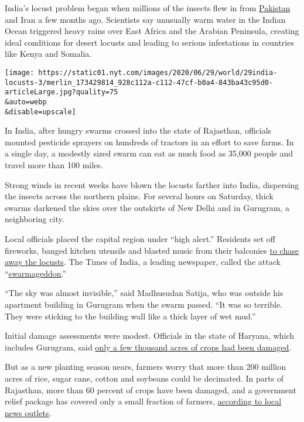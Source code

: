 India's locust problem began when millions of the insects flew in from
\href{https://www.nytimes.com/2020/06/29/world/asia/pakistan-stock-exchange-shooting.html}{Pakistan}
and Iran a few months ago. Scientists say unusually warm water in the
Indian Ocean triggered heavy rains over East Africa and the Arabian
Peninsula, creating ideal conditions for desert locusts and leading to
serious infestations in countries like Kenya and Somalia.

\texttt{[image: https://static01.nyt.com/images/2020/06/29/world/29india-locusts-3/merlin\_173429814\_928c112a-c112-47cf-b0a4-843ba43c95d0-articleLarge.jpg?quality=75\\\&auto=webp\\\&disable=upscale]}

In India, after hungry swarms crossed into the state of Rajasthan,
officials mounted pesticide sprayers on hundreds of tractors in an
effort to save farms. In a single day, a modestly sized swarm can eat as
much food as 35,000 people and travel more than 100 miles.

Strong winds in recent weeks have blown the locusts farther into India,
dispersing the insects across the northern plains. For several hours on
Saturday, thick swarms darkened the skies over the outskirts of New
Delhi and in Gurugram, a neighboring city.

Local officials placed the capital region under ``high alert.''
Residents set off fireworks, banged kitchen utensils and blasted music
from their balconies
\href{https://www.hindustantimes.com/delhi-news/after-locust-swarms-seen-in-delhi-neem-leaves-and-firecrackers-to-chase-pests/story-Rz9CzRaWscDWXbFWUC0EBM.html}{to
chase away the locusts}. The Times of India, a leading newspaper, called
the attack
``\href{https://timesofindia.indiatimes.com/india/swarmageddon-looks-like-this-locusts-fly-into-ncr/articleshow/76668130.cms}{swarmageddon}.''

``The sky was almost invisible,'' said Madhusudan Satija, who was
outside his apartment building in Gurugram when the swarm passed. ``It
was so terrible. They were sticking to the building wall like a thick
layer of wet mud.''

Initial damage assessments were modest. Officials in the state of
Haryana, which includes Gurugram, said
\href{https://www.tribuneindia.com/news/haryana/5-km-long-locust-swarm-haryana-on-alert-105220}{only
a few thousand acres of crops had been damaged}.

But as a new planting season nears, farmers worry that more than 200
million acres of rice, sugar cane, cotton and soybeans could be
decimated. In parts of Rajasthan, more than 60 percent of crops have
been damaged, and a government relief package has covered only a small
fraction of farmers,
\href{https://thewire.in/agriculture/rajasthan-locust-attack-crop-damage-relief}{according
to local news outlets}.

